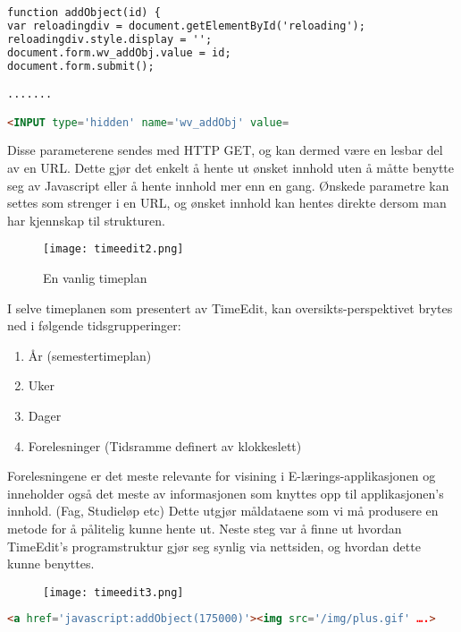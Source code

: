 \documentclass[../main.tex]{subfiles}
\begin{document}
\begin{lstlisting}[language=HTML, frame=single, caption={Kildekode tatt fra TimeEdit-systemet benyttet av HIA}]
function addObject(id) {
var reloadingdiv = document.getElementById('reloading');
reloadingdiv.style.display = '';
document.form.wv_addObj.value = id;
document.form.submit();

.......

<INPUT type='hidden' name='wv_addObj' value=
\end{lstlisting}

Disse parameterene sendes med HTTP GET, og kan dermed være en lesbar del av en URL. Dette gjør det enkelt å hente ut ønsket innhold uten å måtte benytte seg av Javascript eller å hente innhold mer enn en gang. Ønskede parametre kan settes som strenger i en URL, og ønsket innhold kan hentes direkte dersom man har kjennskap til strukturen.

\begin{figure}[H]
  \centering
  \texttt{[image: timeedit2.png]}
  \caption{En vanlig timeplan}
\end{figure}

I selve timeplanen som presentert av TimeEdit, kan oversikts-perspektivet brytes ned i følgende tidsgrupperinger:

\begin{enumerate}
\item År (semestertimeplan)
\item Uker
\item Dager
\item Forelesninger (Tidsramme definert av klokkeslett)
\end{enumerate}

Forelesningene er det meste relevante for visining i E-lærings-applikasjonen og inneholder også det meste av informasjonen som knyttes opp til applikasjonen’s innhold. (Fag, Studieløp etc)
Dette utgjør måldataene som vi må produsere en metode for å pålitelig kunne hente ut.\newline
\newline
Neste steg var å finne ut hvordan TimeEdit’s programstruktur gjør seg synlig via nettsiden, og hvordan dette kunne benyttes.

\begin{figure}[H]
  \centering
  \texttt{[image: timeedit3.png]}
\end{figure}

\begin{lstlisting}[language=HTML, frame=single, caption={BESKRIVLESDDS}]
<a href='javascript:addObject(175000)'><img src='/img/plus.gif' ….>
\end{lstlisting}
\end{document}
